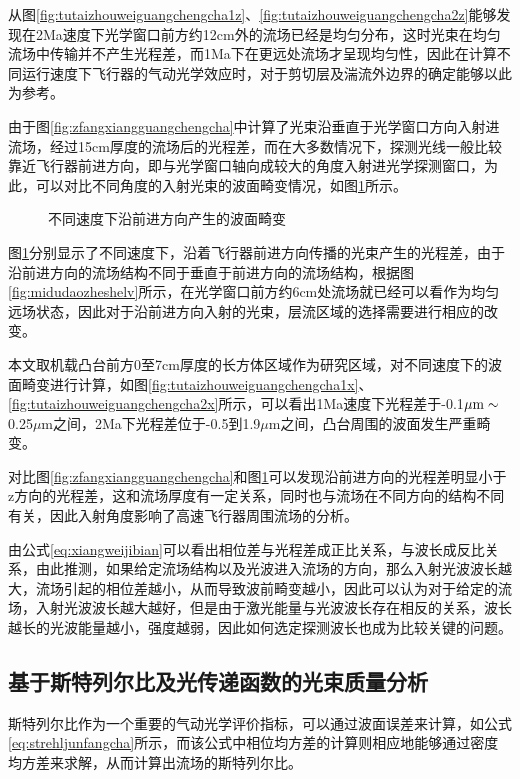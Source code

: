 从图\ref{fig:tutaizhouweiguangchengcha1z}、\ref{fig:tutaizhouweiguangchengcha2z}能够发现在2Ma速度下光学窗口前方约12cm外的流场已经是均匀分布，这时光束在均匀流场中传输并不产生光程差，而1Ma下在更远处流场才呈现均匀性，因此在计算不同运行速度下飞行器的气动光学效应时，对于剪切层及湍流外边界的确定能够以此为参考。

由于图\ref{fig:zfangxiangguangchengcha}中计算了光束沿垂直于光学窗口方向入射进流场，经过15cm厚度的流场后的光程差，而在大多数情况下，探测光线一般比较靠近飞行器前进方向，即与光学窗口轴向成较大的角度入射进光学探测窗口，为此，可以对比不同角度的入射光束的波面畸变情况，如图\ref{fig:xgangxiangguangchengcha}所示。

\begin{figure}[bhtp]
\centering
{}
\caption{不同速度下沿前进方向产生的波面畸变}
\label{fig:xgangxiangguangchengcha}
\end{figure}

图\ref{fig:xgangxiangguangchengcha}分别显示了不同速度下，沿着飞行器前进方向传播的光束产生的光程差，由于沿前进方向的流场结构不同于垂直于前进方向的流场结构，根据图\ref{fig:midudaozheshelv}所示，在光学窗口前方约6cm处流场就已经可以看作为均匀远场状态，因此对于沿前进方向入射的光束，层流区域的选择需要进行相应的改变。

本文取机载凸台前方0至7cm厚度的长方体区域作为研究区域，对不同速度下的波面畸变进行计算，如图\ref{fig:tutaizhouweiguangchengcha1x}、\ref{fig:tutaizhouweiguangchengcha2x}所示，可以看出1Ma速度下光程差于-0.1$\mu{\rm m}\sim$0.25$\mu$m之间，2Ma下光程差位于-0.5到1.9$\mu$m之间，凸台周围的波面发生严重畸变。

对比图\ref{fig:zfangxiangguangchengcha}和图\ref{fig:xgangxiangguangchengcha}可以发现沿前进方向的光程差明显小于z方向的光程差，这和流场厚度有一定关系，同时也与流场在不同方向的结构不同有关，因此入射角度影响了高速飞行器周围流场的分析。

由公式\eqref{eq:xiangweijibian}可以看出相位差与光程差成正比关系，与波长成反比关系，由此推测，如果给定流场结构以及光波进入流场的方向，那么入射光波波长越大，流场引起的相位差越小，从而导致波前畸变越小，因此可以认为对于给定的流场，入射光波波长越大越好，但是由于激光能量与光波波长存在相反的关系，波长越长的光波能量越小，强度越弱，因此如何选定探测波长也成为比较关键的问题。
\subsection{基于斯特列尔比及光传递函数的光束质量分析}
斯特列尔比作为一个重要的气动光学评价指标，可以通过波面误差来计算，如公式\eqref{eq:strehljunfangcha}所示，而该公式中相位均方差的计算则相应地能够通过密度均方差来求解，从而计算出流场的斯特列尔比。

